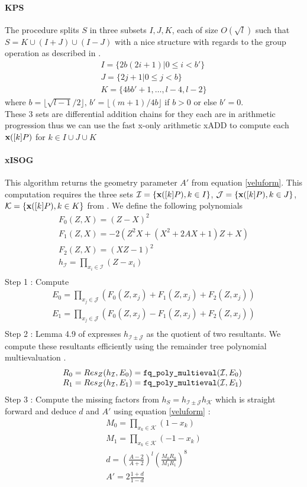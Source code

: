 \documentclass[../main.tex]{subfiles}
\begin{document}
\paragraph{KPS} The procedure  splits $S$ in three subsets $I,J,K$, each of size $O(\sqrt{l})$ such that $S = K\cup(I+J)\cup(I-J)$ with a nice structure with regards to the group operation as described in \cite{}.
\[\begin{array}{l}I = \{2b(2i+1)|0\leq i<b'\} \\
J = \{2j+1|0\leq j<b\} \\
K=\{4bb'+1, \ldots, l-4, l-2\}\end{array}\]
where $b=\lfloor \sqrt{l-1}/2\rfloor,\, b'=\lfloor (m+1)/4b \rfloor$ if $b>0$ or else $b'=0$.\\
These 3 sets are differential addition chains for they each are in arithmetic progression thus we can use the fast x-only arithmetic xADD to compute each $\textbf{x}([k]P)$ for $k\in I\cup J\cup K$

\paragraph{xISOG} This algorithm returns the geometry parameter $A'$ from equation \eqref{veluform}. This computation requires the three sets $\mathcal{I}=\{\textbf{x}([k]P), k\in I\}$, $\mathcal{J}=\{\textbf{x}([k]P), k\in J\}$, $\mathcal{K}=\{\textbf{x}([k]P), k\in K\}$ from . 
We define the following polynomials \[\begin{array}{l}
	F_0(Z,X)=(Z-X)^2\\
	F_1(Z,X)=-2(Z^2X+(X^2+2AX+1)Z+X)\\
	F_2(Z,X)=(XZ-1)^2\\
	h_\mathcal{I}=\prod_{x_i\in\mathcal{I}}(Z-x_i)\\
\end{array}\]
Step 1 : Compute \[\begin{array}{l}
	E_0 = \prod_{x_j\in\mathcal{J}}(F_0(Z,x_j)+F_1(Z,x_j)+F_2(Z,x_j))\\
	E_1 = \prod_{x_j\in\mathcal{J}}(F_0(Z,x_j)-F_1(Z,x_j)+F_2(Z,x_j))\\
\end{array}\]
Step 2 : Lemma 4.9 of \cite{} expresses $h_{\mathcal{I}\pm \mathcal{J}}$ as the quotient of two resultants. We compute these resultants efficiently using the remainder tree polynomial multievaluation . 
\[\begin{array}{l}
	R_0 = Res_Z(h_\mathcal{I},E_0) = \funct{fq_poly_multieval}(\mathcal{I}, E_0)\\
	R_1 = Res_Z(h_\mathcal{I},E_1) = \funct{fq_poly_multieval}(\mathcal{I}, E_1)\
\end{array}\]
Step 3 : Compute the missing factors from $h_S=h_{\mathcal{I}\pm \mathcal{J}}h_\mathcal{K}$ which is straight forward and deduce $d$ and $A'$ using equation \eqref{veluform} :
 \[\begin{array}{l}
	M_0 = \prod_{x_k\in\mathcal{K}}(1-x_k)\\
	M_1 = \prod_{x_k\in\mathcal{K}}(-1-x_k)\\
	d = \left(\frac{A-2}{A+2}\right)^l \left( \frac{M_0R_0}{M_1R_1}\right)^8\\
	A'=2\frac{1+d}{1-d}
 \end{array}\]
\end{document}
